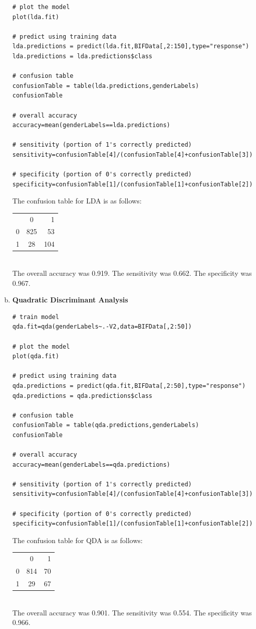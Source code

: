 \documentclass{article}
\begin{document}
\begin{enumerate}[a)]
\begin{verbatim}
# plot the model
plot(lda.fit)

# predict using training data
lda.predictions = predict(lda.fit,BIFData[,2:150],type="response")
lda.predictions = lda.predictions$class

# confusion table
confusionTable = table(lda.predictions,genderLabels)
confusionTable

# overall accuracy
accuracy=mean(genderLabels==lda.predictions)

# sensitivity (portion of 1's correctly predicted)
sensitivity=confusionTable[4]/(confusionTable[4]+confusionTable[3])

# specificity (portion of 0's correctly predicted)
specificity=confusionTable[1]/(confusionTable[1]+confusionTable[2])
\end{verbatim}

The confusion table for LDA is as follows:\\
\begin{tabular}{l c r}
  & 0 & 1 \\
0 & 825 & 53 \\
1 & 28 & 104 \\
\end{tabular}\\
The overall accuracy was 0.919. The sensitivity was 0.662. The specificity was 0.967.\\

\item \textbf{Quadratic Discriminant Analysis}
\begin{verbatim}
# train model
qda.fit=qda(genderLabels~.-V2,data=BIFData[,2:50])

# plot the model
plot(qda.fit)

# predict using training data
qda.predictions = predict(qda.fit,BIFData[,2:50],type="response")
qda.predictions = qda.predictions$class

# confusion table
confusionTable = table(qda.predictions,genderLabels)
confusionTable

# overall accuracy
accuracy=mean(genderLabels==qda.predictions)

# sensitivity (portion of 1's correctly predicted)
sensitivity=confusionTable[4]/(confusionTable[4]+confusionTable[3])

# specificity (portion of 0's correctly predicted)
specificity=confusionTable[1]/(confusionTable[1]+confusionTable[2])
\end{verbatim}
The confusion table for QDA is as follows:\\
\begin{tabular}{l c r}
  & 0 & 1 \\
0 & 814 & 70 \\
1 & 29 & 67 \\
\end{tabular}\\
The overall accuracy was 0.901. The sensitivity was 0.554. The specificity was 0.966.\\



\end{enumerate}
\end{document}
